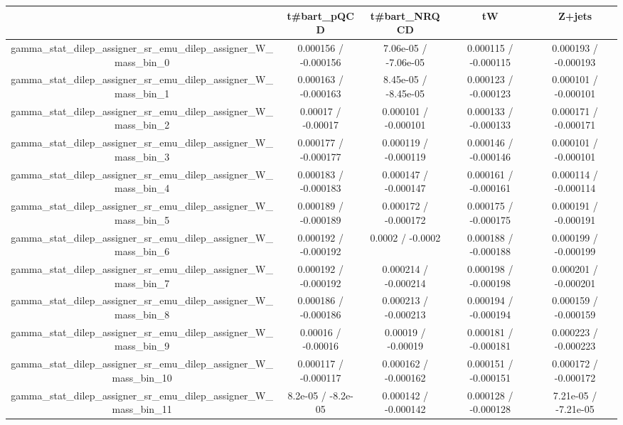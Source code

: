\documentclass[10pt]{article}
\begin{document}
\begin{table}[htbp]
\begin{center}
\begin{tabular}{|c|c|c|c|c|}
\hline 
      & t#bar{t}_{pQCD}      & t#bar{t}_{NRQCD}      & tW      & Z+jets \\ 
\hline 
  gamma_stat_dilep_assigner_sr_emu_dilep_assigner_W_mass_bin_0 & 0.000156 / -0.000156 & 7.06e-05 / -7.06e-05 & 0.000115 / -0.000115 & 0.000193 / -0.000193 \\ 
  gamma_stat_dilep_assigner_sr_emu_dilep_assigner_W_mass_bin_1 & 0.000163 / -0.000163 & 8.45e-05 / -8.45e-05 & 0.000123 / -0.000123 & 0.000101 / -0.000101 \\ 
  gamma_stat_dilep_assigner_sr_emu_dilep_assigner_W_mass_bin_2 & 0.00017 / -0.00017 & 0.000101 / -0.000101 & 0.000133 / -0.000133 & 0.000171 / -0.000171 \\ 
  gamma_stat_dilep_assigner_sr_emu_dilep_assigner_W_mass_bin_3 & 0.000177 / -0.000177 & 0.000119 / -0.000119 & 0.000146 / -0.000146 & 0.000101 / -0.000101 \\ 
  gamma_stat_dilep_assigner_sr_emu_dilep_assigner_W_mass_bin_4 & 0.000183 / -0.000183 & 0.000147 / -0.000147 & 0.000161 / -0.000161 & 0.000114 / -0.000114 \\ 
  gamma_stat_dilep_assigner_sr_emu_dilep_assigner_W_mass_bin_5 & 0.000189 / -0.000189 & 0.000172 / -0.000172 & 0.000175 / -0.000175 & 0.000191 / -0.000191 \\ 
  gamma_stat_dilep_assigner_sr_emu_dilep_assigner_W_mass_bin_6 & 0.000192 / -0.000192 & 0.0002 / -0.0002 & 0.000188 / -0.000188 & 0.000199 / -0.000199 \\ 
  gamma_stat_dilep_assigner_sr_emu_dilep_assigner_W_mass_bin_7 & 0.000192 / -0.000192 & 0.000214 / -0.000214 & 0.000198 / -0.000198 & 0.000201 / -0.000201 \\ 
  gamma_stat_dilep_assigner_sr_emu_dilep_assigner_W_mass_bin_8 & 0.000186 / -0.000186 & 0.000213 / -0.000213 & 0.000194 / -0.000194 & 0.000159 / -0.000159 \\ 
  gamma_stat_dilep_assigner_sr_emu_dilep_assigner_W_mass_bin_9 & 0.00016 / -0.00016 & 0.00019 / -0.00019 & 0.000181 / -0.000181 & 0.000223 / -0.000223 \\ 
  gamma_stat_dilep_assigner_sr_emu_dilep_assigner_W_mass_bin_10 & 0.000117 / -0.000117 & 0.000162 / -0.000162 & 0.000151 / -0.000151 & 0.000172 / -0.000172 \\ 
  gamma_stat_dilep_assigner_sr_emu_dilep_assigner_W_mass_bin_11 & 8.2e-05 / -8.2e-05 & 0.000142 / -0.000142 & 0.000128 / -0.000128 & 7.21e-05 / -7.21e-05 \\ 

\end{tabular}
\end{center}
\end{table}
\end{document}
